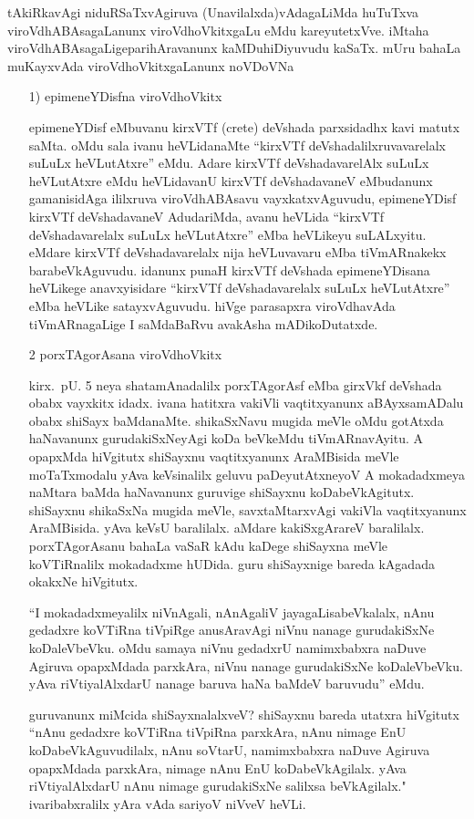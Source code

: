 tAkiRkavAgi niduRSaTxvAgiruva (Unavilalxda)vAdagaLiMda huTuTxva viroVdhA\break BAsagaLanunx viroVdhoVkitxgaLu eMdu kareyutetxVve. iMtaha viroVdhABAsagaLige\break parihAravanunx kaMDuhiDiyuvudu kaSaTx. mUru bahaLa muKayxvAda viroVdhoVkitx\-gaLanunx noVDoVNa
\begin{itemize}
\item[{\rm 1)}] epimeneYDisfna viroVdhoVkitx

epimeneYDisf eMbuvanu kirxVTf {\rm (crete)} deVshada parxsidadhx kavi matutx saMta. oMdu sala ivanu heVLidanaMte ``kirxVTf deVshadalilxruvavarelalx suLuLx heVLutAtxre'' eMdu. Adare kirxVTf deVshadavarelAlx suLuLx heVLutAtxre eMdu heVLidavanU kirxVTf deVshada\-vaneV eMbudanunx gamanisidAga ililxruva viroVdhABAsavu vayxkatxvAguvudu, epimeneYDisf kirxVTf deVshadavaneV AdudariMda, avanu heVLida ``kirxVTf deVshadavarelalx suLuLx heVLutAtxre'' eMba heVLikeyu suLALxyitu. eMdare kirxVTf deVshadavarelalx nija heVLuvavaru eMba tiVmARnakekx barabeVkAguvudu. idanunx punaH kirxVTf deVshada epimeneYDisana heVLikege anavxyisidare ``kirxVTf deVshadavarelalx suLuLx heVLutAtxre'' eMba heVLike satayxvAguvudu. hiVge parasapxra viroVdhavAda tiVmARnagaLige I saMdaBaRvu avakAsha mADikoDutatxde.
\item[{\rm 2}] porxTAgorAsana viroVdhoVkitx

kirx.~pU. {\rm 5} neya shatamAnadalilx porxTAgorAsf eMba girxVkf deVshada obabx vayxkitx idadx. ivana hatitxra vakiVli vaqtitxyanunx aBAyxsamADalu obabx shiSayx baMdanaMte. shikaSxNavu mugida meVle oMdu gotAtxda haNavanunx gurudakiSxNeyAgi koDa beVkeMdu tiVmARnavAyitu. A opapxMda hiVgitutx shiSayxnu vaqtitxyanunx AraMBisida meVle moTaTxmodalu yAva keVsinalilx geluvu paDeyutAtxneyoV A mokadadxmeya naMtara baMda haNavanunx guruvige shiSayxnu koDabeVkAgitutx. shiSayxnu shikaSxNa mugida meVle, savxtaMtarxvAgi vakiVla vaqtitxyanunx AraMBisida. yAva keVsU baralilalx. aMdare kakiSxgArareV baralilalx. porxTAgorAsanu bahaLa vaSaR kAdu kaDege shiSayxna meVle koVTiRnalilx mokadadxme hUDida. guru shiSayxnige bareda kAgadada okakxNe hiVgitutx.

``I mokadadxmeyalilx niVnAgali, nAnAgaliV jayagaLisabeVkalalx, nAnu gedadxre koVTiRna tiVpiRge anusAravAgi niVnu nanage gurudakiSxNe koDaleVbeVku. oMdu samaya niVnu gedadxrU namimxbabxra naDuve Agiruva opapxMdada parxkAra, niVnu nanage gurudakiSxNe koDaleVbeVku. yAva riVtiyalAlxdarU nanage baruva haNa baMdeV baruvudu'' eMdu.

guruvanunx miMcida shiSayxnalalxveV? shiSayxnu bareda utatxra hiVgitutx ``nAnu gedadxre koVTiRna tiVpiRna parxkAra, nAnu nimage EnU koDabeVkAguvudilalx, nAnu soVtarU, namimxbabxra naDuve Agiruva opapxMdada parxkAra, nimage nAnu EnU koDabeVkAgilalx. yAva riVtiyalAlxdarU nAnu nimage gurudakiSxNe salilxsa beVkAgilalx." ivaribabxralilx yAra vAda sariyoV niVveV heVLi.


\end{itemize}
